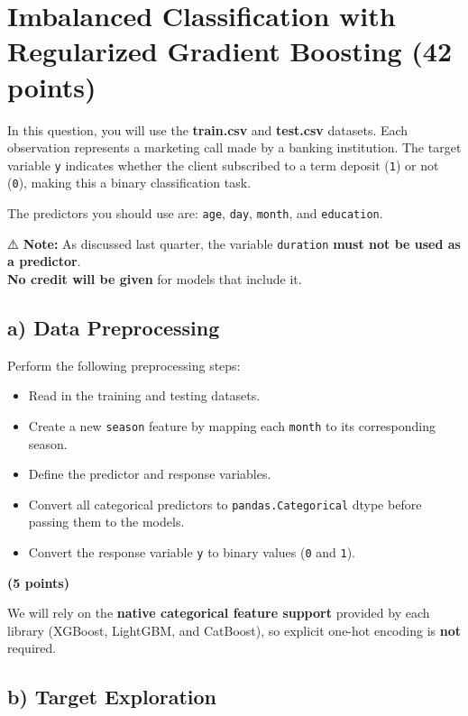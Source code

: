 \documentclass[
  letterpaper,
  DIV=11,
  numbers=noendperiod]{scrreprt}
\providecommand{\tightlist}{%
  \setlength{\itemsep}{0pt}\setlength{\parskip}{0pt}}\usepackage{longtable,booktabs,array}
\begin{document}
\section{Imbalanced Classification with Regularized Gradient Boosting
(42
points)}\label{imbalanced-classification-with-regularized-gradient-boosting-42-points}

In this question, you will use the \textbf{train.csv} and
\textbf{test.csv} datasets. Each observation represents a marketing call
made by a banking institution. The target variable \texttt{y} indicates
whether the client subscribed to a term deposit (\texttt{1}) or not
(\texttt{0}), making this a binary classification task.

The predictors you should use are: \texttt{age}, \texttt{day},
\texttt{month}, and \texttt{education}.

⚠️ \textbf{Note:} As discussed last quarter, the variable
\texttt{duration} \textbf{must not be used as a predictor}.\\
\textbf{No credit will be given} for models that include it.

\subsection{a) Data Preprocessing}\label{a-data-preprocessing}

Perform the following preprocessing steps:

\begin{itemize}
\tightlist
\item
  Read in the training and testing datasets.
\item
  Create a new \texttt{season} feature by mapping each \texttt{month} to
  its corresponding season.
\item
  Define the predictor and response variables.
\item
  Convert all categorical predictors to \texttt{pandas.Categorical}
  dtype before passing them to the models.
\item
  Convert the response variable \texttt{y} to binary values (\texttt{0}
  and \texttt{1}).
\end{itemize}

\textbf{(5 points)}

We will rely on the \textbf{native categorical feature support} provided
by each library (XGBoost, LightGBM, and CatBoost), so explicit one-hot
encoding is \textbf{not} required.

\subsection{b) Target Exploration}\label{b-target-exploration}
\end{document}
